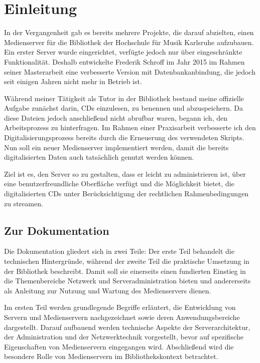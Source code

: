 \documentclass[12pt,a4paper]{report}
\begin{document}
\cleardoublepage
{}
\setcounter{page}{1}
\chapter*{Einleitung}
\setcounter{section}{0}
\renewcommand\thesection{\arabic{section}}

In der Vergangenheit gab es bereits mehrere Projekte, die darauf abzielten, einen Medienserver für die Bibliothek der Hochschule für Musik Karlsruhe aufzubauen. 
Ein erster Server wurde eingerichtet, verfügte jedoch nur über eingeschränkte Funktionalität. 
Deshalb entwickelte Frederik Schroff im Jahr 2015 im Rahmen seiner Masterarbeit eine verbesserte Version mit Datenbankanbindung, 
die jedoch seit einigen Jahren nicht mehr in Betrieb ist.  

Während meiner Tätigkeit als Tutor in der Bibliothek bestand meine offizielle Aufgabe zunächst darin, CDs einzulesen, zu benennen und abzuspeichern. 
Da diese Dateien jedoch anschließend nicht abrufbar waren, begann ich, den Arbeitsprozess zu hinterfragen. 
Im Rahmen einer Praxisarbeit verbesserte ich den Digitalisierungsprozess bereits durch die Erneuerung des verwendeten Skripts. 
Nun soll ein neuer Medienserver implementiert werden, damit die bereits digitalisierten Daten auch tatsächlich genutzt werden können.  

Ziel ist es, den Server so zu gestalten, dass er leicht zu administrieren ist, über eine benutzerfreundliche Oberfläche verfügt 
und die Möglichkeit bietet, die digitalisierten CDs unter Berücksichtigung der rechtlichen Rahmenbedingungen zu streamen.  

\section{Zur Dokumentation}  
Die Dokumentation gliedert sich in zwei Teile: Der erste Teil behandelt die technischen Hintergründe, 
während der zweite Teil die praktische Umsetzung in der Bibliothek beschreibt. 
Damit soll sie einerseits einen fundierten Einstieg in die Themenbereiche Netzwerk und Serveradministration bieten 
und andererseits als Anleitung zur Nutzung und Wartung des Medienservers dienen.  

Im ersten Teil werden grundlegende Begriffe erläutert, die Entwicklung von Servern und Medienservern nachgezeichnet 
sowie deren Anwendungsbereiche dargestellt. Darauf aufbauend werden technische Aspekte der Serverarchitektur, 
der Administration und der Netzwerktechnik vorgestellt, bevor auf spezifische Eigenschaften von Medienservern eingegangen wird. 
Abschließend wird die besondere Rolle von Medienservern im Bibliothekskontext betrachtet.  
\end{document}
